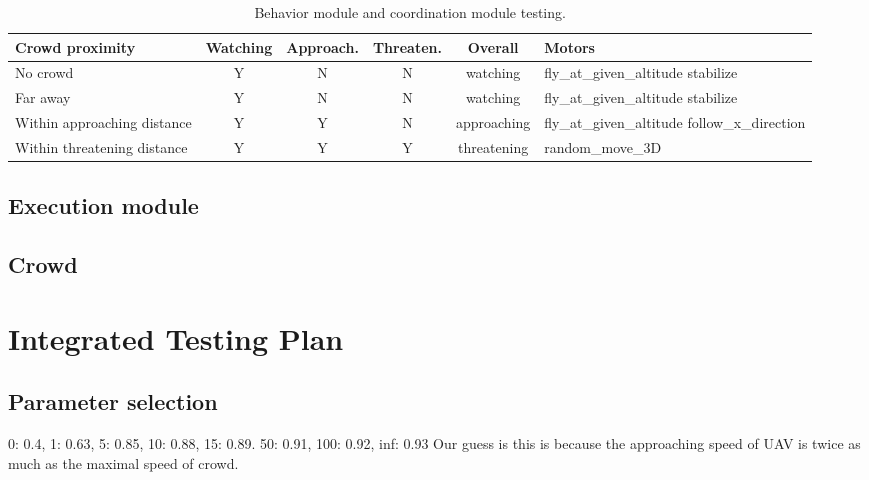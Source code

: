 \begin{table}[htb]
\renewcommand{\arraystretch}{1.3}
\centering
\begin{tabular}{|p{3.1 cm}|c|c|c|c|p{3 cm}|}
\hline
\textbf{Crowd proximity} & \textbf{Watching} & \textbf{Approach.} & \textbf{Threaten.}   & \textbf{Overall} & \textbf{Motors}\\
\hline
No crowd & Y & N & N & watching &  fly\_at\_given\_altitude \newline stabilize\\
\hline
Far away & Y & N & N & watching &  fly\_at\_given\_altitude \newline stabilize\\
\hline
Within approaching \newline distance & Y & Y & N & approaching & fly\_at\_given\_altitude \newline follow\_x\_direction\\
\hline
Within threatening \newline distance & Y & Y & Y &  threatening & random\_move\_3D \\
\hline
\end{tabular}		
\caption {Behavior module and coordination module testing.} \label{behavior}
\end{table}

\subsection{Execution module}

\subsection{Crowd}

\section{Integrated Testing Plan}

\subsection{Parameter selection}
0: 0.4, 1: 0.63, 5: 0.85, 10: 0.88, 15: 0.89. 50: 0.91, 100: 0.92, inf: 0.93
Our guess is this is because the approaching speed of UAV is twice as much as the maximal speed of crowd. 



